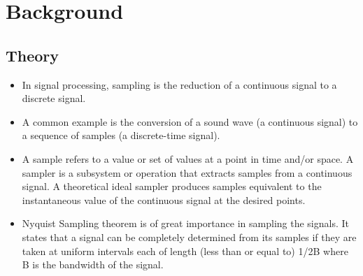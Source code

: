 
\chapter{Background} %
\label{Chapter1}
 \section{Theory}
 \begin{itemize}

  \item  In signal processing, sampling is the reduction of a continuous signal to a discrete signal. 
  \item A common example is the conversion of a sound wave (a continuous signal) to a sequence of samples (a discrete-time signal). 
  \item A sample refers to a value or set of values at a point in time and/or space. A sampler is a subsystem or operation that extracts samples from a continuous signal. A theoretical ideal sampler produces samples equivalent to the instantaneous value of the continuous signal at the desired points. 
  \item Nyquist Sampling theorem is of great importance in sampling the signals. It states that a signal can be completely determined from its samples if they are taken at uniform intervals each of length (less than or equal to) 1/2B where B is the bandwidth of the signal.

\end{itemize}
 


